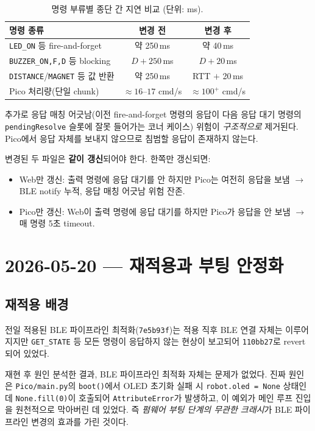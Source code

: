 \documentclass[11pt, oneside]{article}
\begin{document}
\begin{table}[h]
\centering
\small
\begin{tabular}{@{}lcc@{}}
\toprule
명령 종류 & 변경 전 & 변경 후 \\
\midrule
\texttt{LED\_ON} 등 fire-and-forget & 약 250\,ms & 약 40\,ms \\
\texttt{BUZZER\_ON,F,D} 등 blocking & $D + 250$\,ms & $D + 20$\,ms \\
\texttt{DISTANCE}/\texttt{MAGNET} 등 값 반환 & 약 250\,ms & RTT $+$ 20\,ms \\
Pico 처리량(단일 chunk) & $\approx 16$--$17$ cmd/s & $\approx 100^+$ cmd/s \\
\bottomrule
\end{tabular}
\caption{명령 부류별 종단 간 지연 비교 (단위: ms).}
\end{table}

추가로 응답 매칭 어긋남(이전 fire-and-forget 명령의 응답이 다음
응답 대기 명령의 \texttt{pendingResolve} 슬롯에 잘못 들어가는 코너
케이스) 위험이 \emph{구조적으로} 제거된다. Pico에서 응답 자체를
보내지 않으므로 침범할 응답이 존재하지 않는다.

\begin{caution}
변경된 두 파일은 \textbf{같이 갱신}되어야 한다. 한쪽만 갱신되면:
\begin{itemize}
  \item Web만 갱신: 출력 명령에 응답 대기를 안 하지만 Pico는 여전히
        응답을 보냄 $\rightarrow$ BLE notify 누적, 응답 매칭 어긋남 위험 잔존.
  \item Pico만 갱신: Web이 출력 명령에 응답 대기를 하지만 Pico가 응답을
        안 보냄 $\rightarrow$ 매 명령 5초 timeout.
\end{itemize}
\end{caution}

\section{2026-05-20 --- 재적용과 부팅 안정화}

\subsection{재적용 배경}

전일 적용된 BLE 파이프라인 최적화(\texttt{7e5b93f})는 적용 직후 BLE
연결 자체는 이루어지지만 \texttt{GET\_STATE} 등 모든 명령이 응답하지
않는 현상이 보고되어 \texttt{110bb27}로 revert 되어 있었다.

재현 후 원인 분석한 결과, BLE 파이프라인 최적화 자체는 문제가 없었다.
진짜 원인은 \texttt{Pico/main.py}의 \texttt{boot()}에서 OLED 초기화
실패 시 \texttt{robot.oled = None} 상태인데 \texttt{None.fill(0)}이
호출되어 \texttt{AttributeError}가 발생하고, 이 예외가 메인 루프 진입을
원천적으로 막아버린 데 있었다. 즉 \emph{펌웨어 부팅 단계의 무관한
크래시}가 BLE 파이프라인 변경의 효과를 가린 것이다.
\end{document}
